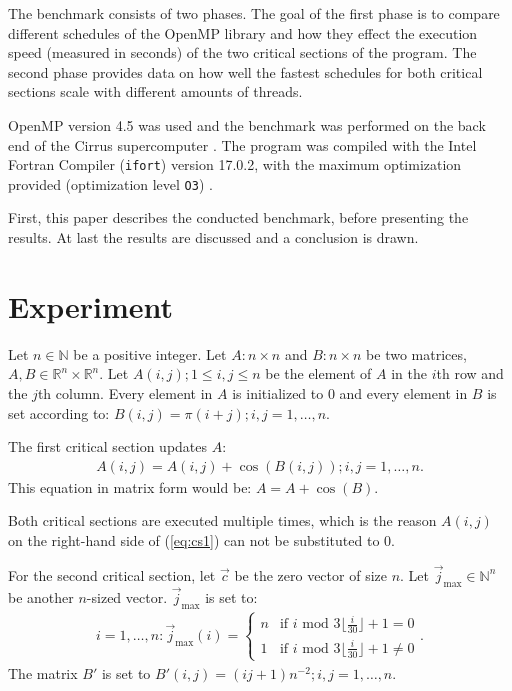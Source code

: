 \documentclass[twoside,11pt]{article}
\begin{document}
The benchmark consists of two phases.
The goal of the first phase is to compare different
schedules of the OpenMP library and how they
effect the execution speed (measured in seconds) of the two
critical sections of the program.
The second phase provides data on how well the fastest
schedules for both critical sections scale with
different amounts of threads.

OpenMP version 4.5 was used and the benchmark was performed
on the back end of the Cirrus supercomputer
\citep[see][]{openmp, cirrus}.
The program was compiled with the Intel Fortran Compiler
(\texttt{ifort}) version 17.0.2, with the maximum
optimization provided (optimization level \texttt{O3})
\citep[see][]{ifort}.

First, this paper describes the conducted benchmark,
before presenting the results. At last the results are
discussed and a conclusion is drawn.


\section{Experiment} %
\label{sec:exp}

Let $n \in \mathbb{N}$ be a positive integer.
Let $A: n \times n$ and $B: n \times n$ be two matrices,
$A, B \in \mathbb{R}^n \times \mathbb{R}^n$.
Let $A(i, j); 1 \leq i, j \leq n$ be the element of $A$ in
the $i$th row and the $j$th column.
Every element in $A$ is initialized to 0 and every element
in $B$ is set according to:
$B(i, j) = \pi(i+j); i,j=1,\dots,n$.

The first critical section updates $A$:
\begin{align}
  \label{eq:cs1}
  A(i, j) = A(i, j) + \cos(B(i, j)); i,j=1,\dots,n.
\end{align}
This equation in matrix form would be: $A = A + \cos(B)$.

Both critical sections are executed multiple times, which
is the reason $A(i, j)$ on the right-hand side of
(\ref{eq:cs1}) can not be substituted to 0.

\def\jmax{\vec{j}_{\text{max} }}

For the second critical section,
let $\vec{c}$ be the zero vector of size $n$.
Let $\jmax \in \mathbb{N}^n$ be another $n$-sized vector.
$\jmax$ is set to:
\begin{align}
  \label{eq:jmax}
  i=1,\dots,n: \jmax(i) =
  \begin{cases}
    n &\text{if } i \text{ mod }
       3\lfloor \frac{i}{30} \rfloor + 1 = 0 \\
    1 &\text{if } i \text{ mod }
       3\lfloor \frac{i}{30} \rfloor + 1 \neq 0
  \end{cases}.
\end{align}
The matrix $B'$ is set to $B'(i, j) = (ij + 1)n^{-2};
i,j = 1,\dots,n$.
\end{document}
